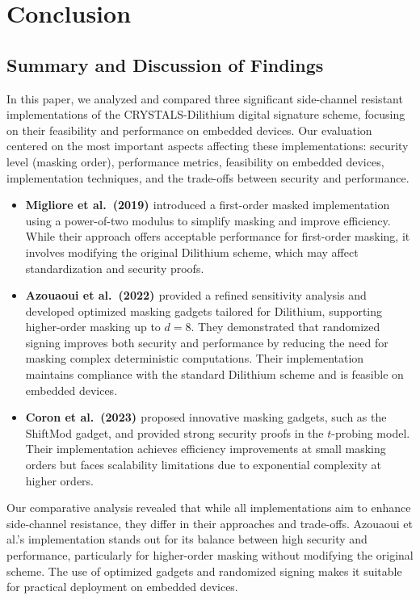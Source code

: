 
\chapter{Conclusion}
\thispagestyle{chapterstart}

\section{Summary and Discussion of Findings}

In this paper, we analyzed and compared three significant side-channel resistant implementations of the CRYSTALS-Dilithium digital signature scheme, focusing on their feasibility and performance on embedded devices. Our evaluation centered on the most important aspects affecting these implementations: security level (masking order), performance metrics, feasibility on embedded devices, implementation techniques, and the trade-offs between security and performance.

\begin{itemize}
    \item \textbf{Migliore et al.\ (2019) \cite{Migliore19}} introduced a first-order masked implementation using a power-of-two modulus to simplify masking and improve efficiency. While their approach offers acceptable performance for first-order masking, it involves modifying the original Dilithium scheme, which may affect standardization and security proofs.
    \item \textbf{Azouaoui et al.\ (2022) \cite{Azouaoui22}} provided a refined sensitivity analysis and developed optimized masking gadgets tailored for Dilithium, supporting higher-order masking up to $d=8$. They demonstrated that randomized signing improves both security and performance by reducing the need for masking complex deterministic computations. Their implementation maintains compliance with the standard Dilithium scheme and is feasible on embedded devices.
    \item \textbf{Coron et al.\ (2023) \cite{Coron23}} proposed innovative masking gadgets, such as the ShiftMod gadget, and provided strong security proofs in the $t$-probing model. Their implementation achieves efficiency improvements at small masking orders but faces scalability limitations due to exponential complexity at higher orders.
\end{itemize}

Our comparative analysis revealed that while all implementations aim to enhance side-channel resistance, they differ in their approaches and trade-offs. Azouaoui et al.'s implementation stands out for its balance between high security and performance, particularly for higher-order masking without modifying the original scheme. The use of optimized gadgets and randomized signing makes it suitable for practical deployment on embedded devices.

